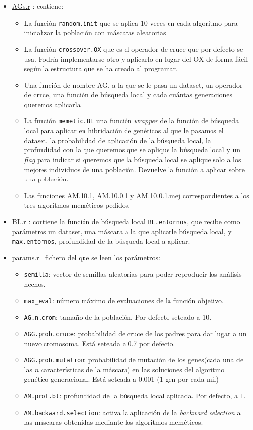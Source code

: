 \documentclass[a4paper,11pt]{article}
\newcommand{\hrefr}[1]{
\href{../bin/#1}{#1}
}
\begin{document}
\begin{itemize}
 \item \hrefr{AGs.r}: contiene:
  \begin{itemize}
   \item La función \texttt{random.init} que se aplica 10 veces en cada algoritmo para inicializar la
 población con máscaras aleatorias
   \item La función \texttt{crossover.OX} que es el operador de cruce que por defecto se usa. Podría implementarse otro y
   aplicarlo en lugar del OX de forma fácil según la estructura que se ha creado al programar.
   \item Una función de nombre AG, a la que se le pasa un dataset, un operador de cruce, una función de búsqueda local y
   cada cuántas generaciones queremos aplicarla
   \item La función \texttt{memetic.BL} una función \textit{wrapper} de la función de búsqueda local para aplicar en 
   hibridación de genéticos al que le pasamos el dataset, la probabilidad de aplicación de la búsqueda local, 
   la profundidad con la que queremos que se aplique la búsqueda local y un \textit{flag} para indicar si queremos que la
   búsqueda local se aplique solo a los mejores individuos de una población. Devuelve la función a aplicar sobre una población.
   \item Las funciones AM.10.1, AM.10.0.1 y AM.10.0.1.mej correspondientes a los tres algoritmos meméticos pedidos.
  \end{itemize}
  
 \item \hrefr{BL.r}: contiene la función de búsqueda local \texttt{BL.entornos}, que recibe como parámetros un dataset,
 una máscara a la que aplicarle búsqueda local, y \texttt{max.entornos}, profundidad de la búsqueda local a aplicar.

 
 \item \hrefr{params.r}: fichero del que se leen los parámetros:
  \begin{itemize}
    \item \texttt{semilla}: vector de semillas aleatorias para poder reproducir los análisis hechos.
    \item \texttt{max\_eval}: número máximo de evaluaciones de la función objetivo.
    \item \texttt{AG.n.crom}: tamaño de la población. Por defecto seteado a 10.
    \item \texttt{AGG.prob.cruce}: probabilidad de cruce de los padres para dar lugar a un nuevo cromosoma. 
    Está seteada a 0.7 por defecto.
    \item \texttt{AGG.prob.mutation}: probabilidad de mutación de los genes(cada una de las $n$ características
    de la máscara) en las soluciones del algoritmo genético generacional. Está seteada a 0.001 (1 gen por cada mil)
    \item \texttt{AM.prof.bl}: profundidad de la búsqueda local aplicada. Por defecto, a 1.
    \item \texttt{AM.backward.selection}: activa la aplicación de la \textit{backward selection} a las máscaras obtenidas
    mediante los algoritmos meméticos.
  \end{itemize}
  

\end{itemize}
\end{document}
